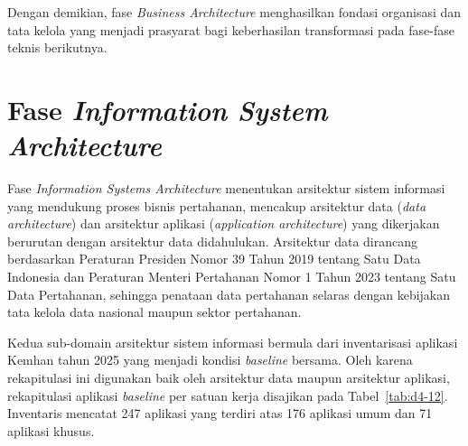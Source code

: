 Dengan demikian, fase \textit{Business Architecture} menghasilkan fondasi organisasi dan tata kelola yang menjadi prasyarat bagi keberhasilan transformasi pada fase-fase teknis berikutnya.

\section{Fase \textit{Information System Architecture}}

Fase \textit{Information Systems Architecture} menentukan arsitektur sistem informasi yang mendukung proses bisnis pertahanan, mencakup arsitektur data (\textit{data architecture}) dan arsitektur aplikasi (\textit{application architecture}) yang dikerjakan berurutan dengan arsitektur data didahulukan. Arsitektur data dirancang berdasarkan Peraturan Presiden Nomor 39 Tahun 2019 tentang Satu Data Indonesia dan Peraturan Menteri Pertahanan Nomor 1 Tahun 2023 tentang Satu Data Pertahanan, sehingga penataan data pertahanan selaras dengan kebijakan tata kelola data nasional maupun sektor pertahanan.

Kedua sub-domain arsitektur sistem informasi bermula dari inventarisasi aplikasi Kemhan tahun 2025 yang menjadi kondisi \textit{baseline} bersama. Oleh karena rekapitulasi ini digunakan baik oleh arsitektur data maupun arsitektur aplikasi, rekapitulasi aplikasi \textit{baseline} per satuan kerja disajikan pada Tabel~\ref{tab:d4-12}. Inventaris mencatat 247 aplikasi yang terdiri atas 176 aplikasi umum dan 71 aplikasi khusus.

